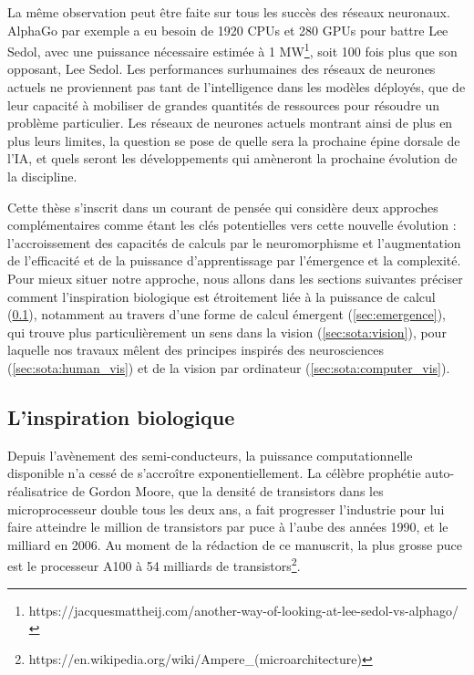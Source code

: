 	La même observation peut être faite sur tous les succès des réseaux neuronaux. AlphaGo par exemple a eu besoin de 1920 CPUs et 280 GPUs pour battre Lee Sedol, avec une puissance nécessaire estimée à 1 MW\footnote{https://jacquesmattheij.com/another-way-of-looking-at-lee-sedol-vs-alphago/}, soit 100 fois plus que son opposant, Lee Sedol. Les performances surhumaines des réseaux de neurones actuels ne proviennent pas tant de l'intelligence dans les modèles déployés, que de leur capacité à mobiliser de grandes quantités de ressources pour résoudre un problème particulier. Les réseaux de neurones actuels montrant ainsi de plus en plus leurs limites, la question se pose de quelle sera la prochaine épine dorsale de l'IA, et quels seront les développements qui amèneront la prochaine évolution de la discipline. 
	
	Cette thèse s'inscrit dans un courant de pensée qui considère deux approches complémentaires comme étant les clés potentielles vers cette nouvelle évolution : l'accroissement des capacités de calculs par le neuromorphisme et l'augmentation de l'efficacité et de la puissance d'apprentissage par l'émergence et la complexité. Pour mieux situer notre approche, nous allons dans les sections suivantes préciser comment l'inspiration biologique est étroitement liée à la puissance de calcul (\ref{sec:bio}), notamment au travers d'une forme de calcul émergent (\ref{sec:emergence}), qui trouve plus particulièrement un sens dans la vision (\ref{sec:sota:vision}), pour laquelle nos travaux mêlent des principes inspirés des neurosciences (\ref{sec:sota:human_vis}) et de la vision par ordinateur (\ref{sec:sota:computer_vis}).

\subsection{L'inspiration biologique}\label{sec:bio}

	Depuis l'avènement des semi-conducteurs, la puissance computationnelle disponible n'a cessé de s'accroître exponentiellement. La célèbre prophétie auto-réalisatrice de Gordon Moore, que la densité de transistors dans les microprocesseur double tous les deux ans, a fait progresser l'industrie pour lui faire atteindre le million de transistors par puce à l'aube des années 1990, et le milliard en 2006. Au moment de la rédaction de ce manuscrit, la plus grosse puce est le processeur A100 à 54 milliards de transistors\footnote{https://en.wikipedia.org/wiki/Ampere\_(microarchitecture)}.

